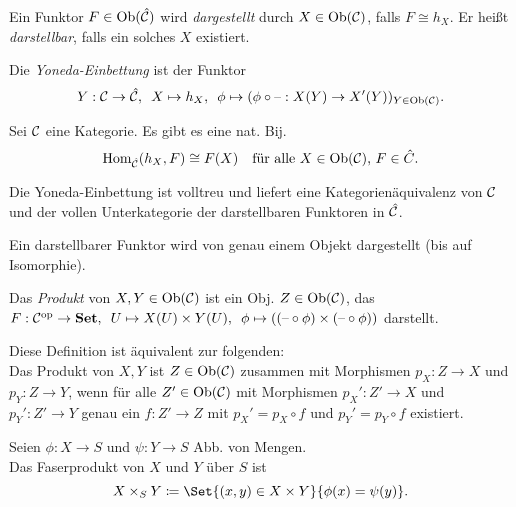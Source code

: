 \documentclass{cheat-sheet}
\begin{document}
\begin{defn}
  Ein Funktor $F \in \operatorname{Ob}(\hat{\mathcal{C}})$ wird \emph{dargestellt} durch $X \in \operatorname{Ob}(\mathcal{C})$, falls $F \cong h_X$.
  Er heißt \emph{darstellbar}, falls ein solches $X$ existiert.
\end{defn}

\begin{defn}
  Die \emph{Yoneda-Einbettung} ist der Funktor
  \[ Y : \mathcal{C} \to \hat{\mathcal{C}}, \enspace X \mapsto h_X, \enspace \phi \mapsto (\phi \circ \text{--} : X(Y) \to X'(Y))_{Y \in \operatorname{Ob}(\mathcal{C})}. \]
\end{defn}

\begin{lem}
  Sei $\mathcal{C}$ eine Kategorie. Es gibt es eine nat. Bij.
  \[
    \operatorname{Hom}_{\hat{\mathcal{C}}}(h_X, F) \cong F(X) \quad
    \text{für alle $X \in \operatorname{Ob}(\mathcal{C})$, $F \in \hat{C}$.}
  \]
\end{lem}

\begin{kor}
  Die Yoneda-Einbettung ist volltreu und liefert eine Kategorienäquivalenz von $\mathcal{C}$ und der vollen Unterkategorie der darstellbaren Funktoren in $\hat{\mathcal{C}}$.
\end{kor}

\begin{kor}
  Ein darstellbarer Funktor wird von genau einem Objekt dargestellt (bis auf Isomorphie).
\end{kor}

\begin{defn}
  Das \emph{Produkt} von $X, Y \in \operatorname{Ob}(\mathcal{C})$ ist ein Obj. $Z \in \operatorname{Ob}(\mathcal{C})$, das
  $F : \mathcal{C}^{\mathrm{op}} \to \mathbf{Set}, \enspace U \mapsto X(U) \times Y(U), \enspace \phi \mapsto ((\text{--} \circ \phi) \times (\text{--} \circ \phi))$ darstellt.
\end{defn}

\begin{bem}
  Diese Definition ist äquivalent zur folgenden: \\
  Das Produkt von $X, Y$ ist $Z \in \operatorname{Ob}(\mathcal{C})$ zusammen mit Morphismen
  $p_X : Z \to X$ und $p_Y : Z \to Y$,
  wenn für alle $Z' \in \operatorname{Ob}(\mathcal{C})$ mit Morphismen 
  $p_X' : Z' \to X$ und $p_Y' : Z' \to Y$
  genau ein $f : Z' \to Z$ mit $p_X' = p_X \circ f$ und $p_Y' = p_Y \circ f$ existiert.
\end{bem}

\begin{defn}
  Seien $\phi : X \to S$ und $\psi : Y \to S$ Abb. von Mengen. \\
  Das Faserprodukt von $X$ und $Y$ über $S$ ist
  \[ X \times_S Y \coloneqq \Set{ (x, y) \in X \times Y }{ \phi(x) = \psi(y) }. \]
\end{defn}
\end{document}
